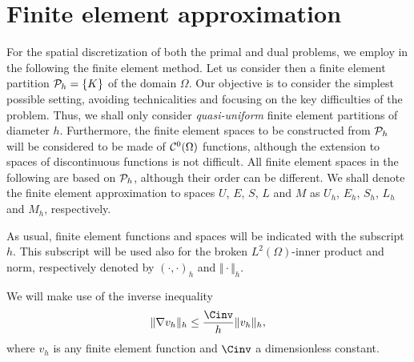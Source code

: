 
\section{Finite element approximation}

For the spatial discretization of both the primal and dual problems, we employ in the following the finite element method. Let us consider then a finite element partition ${\cal P}_h = \{ K\}$ of the domain $\Omega$. Our objective is to consider the simplest possible setting, avoiding technicalities and focusing on the key difficulties of the problem. Thus, we shall only consider {\em quasi-uniform} finite element partitions of diameter $h$. Furthermore, the finite element spaces to be constructed from ${\cal P}_h$ will be considered to be made of ${\cal C}^0(\Omega)$ functions, although the extension to spaces of discontinuous functions is not difficult. All finite element spaces in the following are based on ${\cal P}_h$, although their order can be different. We shall denote the finite element approximation to spaces $U$, $E$, $S$, $L$ and $M$ as $U_h$, $E_h$, $S_h$, $L_h$ and $M_h$, respectively.

As usual, finite element functions and spaces will be indicated with the subscript $h$. This subscript will be used also for the broken $L^2(\Omega)$-inner product and norm, respectively denoted by $(\cdot,\cdot)_h$ and $\Vert\cdot\Vert_h$.

We will make use of the inverse inequality
\begin{align}
\Vert \nabla v_h\Vert_h \leq \frac{\Cinv}{h}\Vert v_h\Vert_h,\label{eq:inv-ineq}
\end{align}
where $v_h$ is any finite element function and $\Cinv$ a dimensionless constant.

